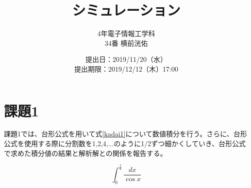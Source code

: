 \documentclass[10pt,titlepage]{jsarticle}
\title{シミュレーション}
\author{4年電子情報工学科\\34番 横前洸佑}
\date{提出日：2019/11/20（水）\\	提出期限：2019/12/12（木）17:00}
\begin{document}
\maketitle

\section{課題1}
課題1では、台形公式を用いて式\ref{kadai1}について数値積分を行う。さらに、台形公式を使用する際に分割数を1,2,4,...のように1/2ずつ細かくしていき、台形公式で求めた積分値の結果と解析解との関係を報告する。

\begin{equation}
\label{kadai1}
	\int_0^\frac{\pi}{6} \frac{dx}{\cos x}
\end{equation}
\end{document}

